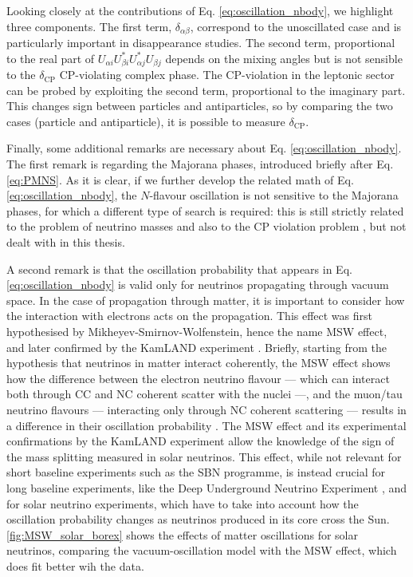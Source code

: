 Looking closely at the contributions of Eq. \eqref{eq:oscillation_nbody}, we highlight three components. The first term, $\delta_{\alpha\beta}$, correspond to the unoscillated case and is particularly important in disappearance studies. The second term, proportional to the real part of $U_{\alpha i} U_{\beta i}^* U_{\alpha j}^* U_{\beta j}$ depends on the mixing angles but is not sensible to the $\delta_\mathrm{CP}$ CP-violating complex phase. 
The CP-violation in the leptonic sector can be probed by exploiting the second term, proportional to the imaginary part. This changes sign between particles and antiparticles, so by comparing the two cases (particle and antiparticle), it is possible to measure $\delta_\mathrm{CP}$. 

Finally, some additional remarks are necessary about Eq. \eqref{eq:oscillation_nbody}. The first remark is regarding the Majorana phases, introduced briefly after Eq. \eqref{eq:PMNS}. As it is clear, if we further develop the related math of Eq. \eqref{eq:oscillation_nbody}, the $N$-flavour oscillation is not sensitive to the Majorana phases, for which a different type of search is required: this is still strictly related to the problem of neutrino masses and also to the CP violation problem \cite{brancoMajoranaNeutrinosCP1986, navasReviewParticlePhysics2024}, but not dealt with in this thesis. 

A second remark is that the oscillation probability that appears in Eq. \eqref{eq:oscillation_nbody} is valid only for neutrinos propagating through vacuum space.
In the case of propagation through matter, it is important to consider how the interaction with electrons acts on the propagation. 
This effect was first hypothesised by Mikheyev-Smirnov-Wolfenstein, hence the name MSW effect, and later confirmed by the KamLAND experiment \cite{collaborationFirstResultsKamLAND2003}. 
Briefly, starting from the hypothesis that neutrinos in matter interact coherently, the MSW effect shows how the difference between the electron neutrino flavour --- which can interact both through CC and NC coherent scatter with the nuclei ---, and the muon/tau neutrino flavours --- interacting only through NC coherent scattering --- results in a difference in their oscillation probability \cite{mikheevResonantAmplificationNeutrino1986, mikheyevResonanceAmplificationOscillations1985, wolfensteinNeutrinoOscillationsMatter1978}. 
The MSW effect and its experimental confirmations by the KamLAND experiment allow the knowledge of the sign of the mass splitting measured in solar neutrinos. 
This effect, while not relevant for short baseline experiments such as the SBN programme, is instead crucial for long baseline experiments, like the Deep Underground Neutrino Experiment \cite{kellyMatterDensityProfile2018}, and for solar neutrino experiments, which have to take into account how the oscillation probability changes as neutrinos produced in its core cross the Sun. \autoref{fig:MSW_solar_borex} shows the effects of matter oscillations for solar neutrinos, comparing the vacuum-oscillation model with the MSW effect, which does fit better wih the data. 


